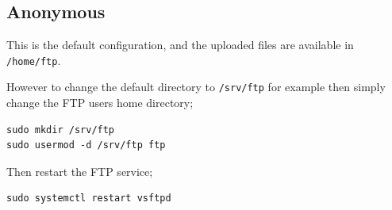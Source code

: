 \subsection{Anonymous}

This is the default configuration, and the uploaded files are available in \texttt{/home/ftp}.

However to change the default directory to \texttt{/srv/ftp} for example then simply change the FTP users home directory;

\begin{lstlisting}
sudo mkdir /srv/ftp
sudo usermod -d /srv/ftp ftp 
\end{lstlisting}

Then restart the FTP service;

\begin{lstlisting}
sudo systemctl restart vsftpd
\end{lstlisting}